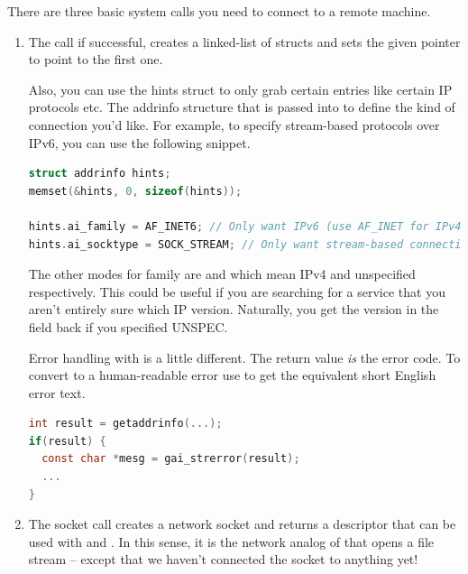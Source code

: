 There are three basic system calls you need to connect to a remote machine.

\begin{enumerate}

\item {}

The  call if successful, creates a linked-list of  structs and sets the given pointer to point to the first one.

Also, you can use the hints struct to only grab certain entries like certain IP protocols etc.
The addrinfo structure that is passed into  to define the kind of connection you'd like.
For example, to specify stream-based protocols over IPv6, you can use the following snippet.

\begin{lstlisting}[language=C]
struct addrinfo hints;
memset(&hints, 0, sizeof(hints));

hints.ai_family = AF_INET6; // Only want IPv6 (use AF_INET for IPv4)
hints.ai_socktype = SOCK_STREAM; // Only want stream-based connection
\end{lstlisting}

The other modes for family are  and  which mean IPv4 and unspecified respectively.
This could be useful if you are searching for a service that you aren't entirely sure which IP version.
Naturally, you get the version in the field back if you specified UNSPEC.

Error handling with  is a little different.
The return value \emph{is} the error code.
To convert to a human-readable error use  to get the equivalent short English error text.

\begin{lstlisting}[language=C]
int result = getaddrinfo(...);
if(result) {
  const char *mesg = gai_strerror(result);
  ...
}
\end{lstlisting}


\item {}

The socket call creates a network socket and returns a descriptor that can be used with  and .
In this sense, it is the network analog of  that opens a file stream -- except that we haven't connected the socket to anything yet!


\end{enumerate}
